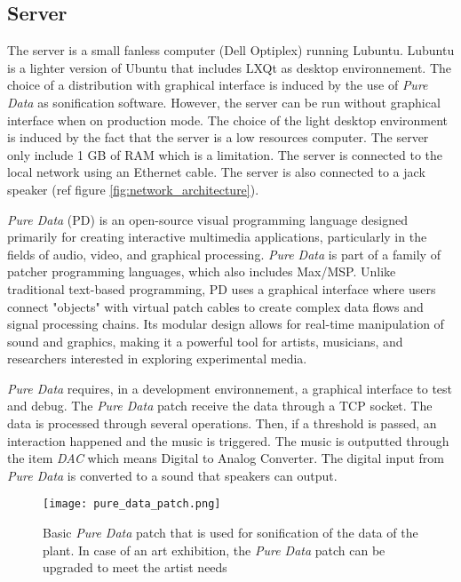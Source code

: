 \subsection{Server}

The server is a small fanless computer (Dell Optiplex) running Lubuntu. Lubuntu is a lighter version of Ubuntu that includes LXQt as desktop environnement. The choice of a distribution with graphical interface is induced by the use of \textit{Pure Data} as sonification software. However, the server can be run without graphical interface when on production mode. The choice of the light desktop environment is induced by the fact that the server is a low resources computer. The server only include 1 GB of RAM which is a limitation. The server is connected to the local network using an Ethernet cable. The server is also connected to a jack speaker (ref figure \ref{fig:network_architecture}).





\textit{Pure Data} (PD) is an open-source visual programming language designed primarily for creating interactive multimedia applications, particularly in the fields of audio, video, and graphical processing.
\textit{Pure Data} is part of a family of patcher programming languages, which also includes Max/MSP.
Unlike traditional text-based programming, PD uses a graphical interface where users connect
"objects" with virtual patch cables to create complex data flows and signal processing chains.
Its modular design allows for real-time manipulation of sound and graphics, making it a powerful
tool for artists, musicians, and researchers interested in exploring experimental media.

\textit{Pure Data} requires, in a development environnement, a graphical interface to test and debug.
The \textit{Pure Data} patch receive the data through a TCP socket. The data is processed through several
operations. Then, if a threshold is passed, an interaction happened and the music is triggered.
The music is outputted through the item \textit{DAC} which means Digital to Analog Converter.
The digital input from \textit{Pure Data} is converted to a sound that speakers can output.

\begin{figure}[h]
    \centering
    \texttt{[image: pure\_data\_patch.png]}
    \caption{Basic \textit{Pure Data} patch that is used for sonification of the data
        of the plant. In case of an art exhibition, the \textit{Pure Data} patch can be upgraded to meet the
        artist needs}
    \vspace{0.1cm}
    \label{fig:pure_data_patch}
\end{figure}


